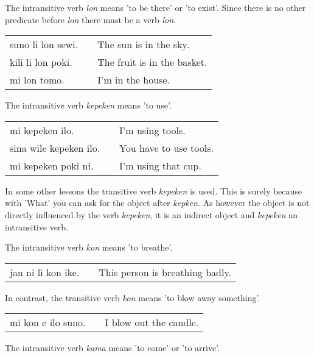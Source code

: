The intransitive verb \textit{lon} means 'to be there' or 'to exist'.
Since there is no other predicate before \textit{lon} there must be a verb \textit{lon}.

\begin{supertabular}{p{5,5cm}|ll}
    suno li lon sewi. &  & The sun is in the sky.      \\
    kili li lon poki. &  & The fruit is in the basket. \\
    mi lon tomo.      &  & I'm in the house.           \\
\end{supertabular}

The intransitive verb \textit{kepeken} means 'to use'.

\begin{supertabular}{p{5,5cm}|ll}
    mi kepeken ilo.        &  & I'm using tools.       \\
    sina wile kepeken ilo. &  & You have to use tools. \\
    mi kepeken poki ni.    &  & I'm using that cup.    \\
\end{supertabular}

In some other lessons the transitive verb \textit{kepeken} is used.
This is surely because with 'What' you can ask for the object after \textit{kepken}.
As however the object is not directly influenced by the verb \textit{kepeken}, it is an indirect object and \textit{kepeken} an intransitive verb.

The intransitive verb \textit{kon} means 'to breathe'.

\begin{supertabular}{p{5,5cm}|ll}
    jan ni li kon ike. &  & This person is breathing badly. \\
\end{supertabular}

In contrast, the transitive verb \textit{kon} means 'to blow away something'.

\begin{supertabular}{p{5,5cm}|ll}
    mi kon e ilo suno. &  & I blow out the candle. \\
\end{supertabular}

The intransitive verb \textit{kama} means 'to come' or 'to arrive'.

